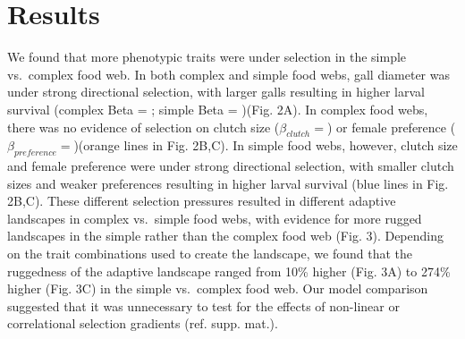 \documentclass[]{elsarticle} %
\newenvironment{Shaded}{\begin{snugshade}}{\end{snugshade}}
\newcommand{\KeywordTok}[1]{\textcolor[rgb]{0.13,0.29,0.53}{\textbf{#1}}}
\newcommand{\DataTypeTok}[1]{\textcolor[rgb]{0.13,0.29,0.53}{#1}}
\newcommand{\DecValTok}[1]{\textcolor[rgb]{0.00,0.00,0.81}{#1}}
\newcommand{\FloatTok}[1]{\textcolor[rgb]{0.00,0.00,0.81}{#1}}
\newcommand{\StringTok}[1]{\textcolor[rgb]{0.31,0.60,0.02}{#1}}
\newcommand{\ControlFlowTok}[1]{\textcolor[rgb]{0.13,0.29,0.53}{\textbf{#1}}}
\newcommand{\OperatorTok}[1]{\textcolor[rgb]{0.81,0.36,0.00}{\textbf{#1}}}
\newcommand{\NormalTok}[1]{#1}
\begin{document}
\begin{Shaded}
\end{Shaded}

\section{Results}\label{results}

We found that more phenotypic traits were under selection in the simple
vs.~complex food web. In both complex and simple food webs, gall
diameter was under strong directional selection, with larger galls
resulting in higher larval survival (complex Beta = ; simple Beta =
)(Fig. 2A). In complex food webs, there was no evidence of selection on
clutch size (\(\beta_{clutch}=\)) or female preference
(\(\beta_{preference}=\))(orange lines in Fig. 2B,C). In simple food
webs, however, clutch size and female preference were under strong
directional selection, with smaller clutch sizes and weaker preferences
resulting in higher larval survival (blue lines in Fig. 2B,C). These
different selection pressures resulted in different adaptive landscapes
in complex vs.~simple food webs, with evidence for more rugged
landscapes in the simple rather than the complex food web (Fig. 3).
Depending on the trait combinations used to create the landscape, we
found that the ruggedness of the adaptive landscape ranged from 10\%
higher (Fig. 3A) to 274\% higher (Fig. 3C) in the simple vs.~complex
food web. Our model comparison suggested that it was unnecessary to test
for the effects of non-linear or correlational selection gradients (ref.
supp. mat.).
\end{document}
